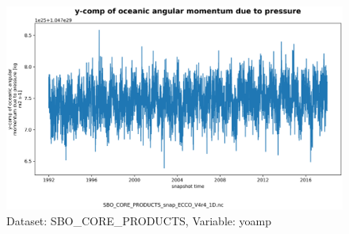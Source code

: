 \begin{figure}[H]
\centering
\includegraphics[scale=0.55]{../images/plots/v4r4/oneD_plots/SBO_Core_Products/yoamp.png}
\caption{Dataset: SBO\_CORE\_PRODUCTS, Variable: yoamp}
\label{tab:table-SBO_CORE_PRODUCTS_yoamp-Plot}
\end{figure}
\newpage
\pagebreak
